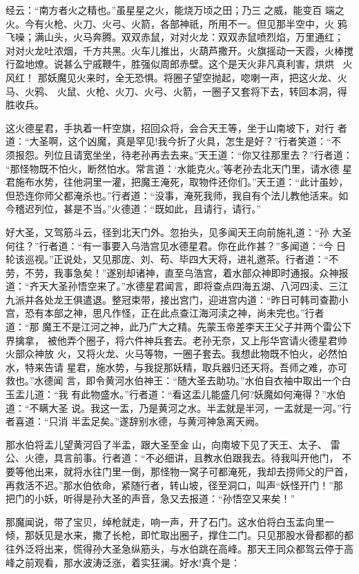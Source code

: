 经云：“南方者火之精也。”虽星星之火，能烧万顷之田；乃三之威，能变百
端之火。今有火枪、火刀、火弓、火箭，各部神祇，所用不一。但见那半空中，火
鸦飞噪；满山头，火马奔腾。双双赤鼠，对对火龙：双双赤鼠喷烈焰，万里通红；
对对火龙吐浓烟，千方共黑。火车儿推出，火葫芦撒开。火旗摇动一天霞，火棒搅
行盈地燎。说甚么宁戚鞭牛，胜强似周郎赤壁。这个是天火非凡真利害，烘烘
火风红！
那妖魔见火来时，全无恐惧。将圈子望空抛起，唿喇一声，把这火龙、火马、火鸦、
火鼠、火枪、火刀、火弓、火箭，一圈子又套将下去，转回本洞，得胜收兵。

这火德星君，手执着一杆空旗，招回众将，会合天王等，坐于山南坡下，对行
者道：“大圣啊，这个凶魔，真是罕见!我今折了火具，怎生是好？”行者笑道：“不
须报怨。列位且请宽坐坐，待老孙再去去来。”天王道：“你又往那里去？”行者道：
“那怪物既不怕火，断然怕水。常言道：‘水能克火。’等老孙去北天门里，请水德
星君施布水势，往他洞里一灌，把魔王淹死，取物件还你们。”天王道：“此计虽妙，
但恐连你师父都淹杀也。”行者道：“没事，淹死我师，我自有个法儿教他活来。如
今稽迟列位，甚是不当。”火德道：“既如此，且请行，请行。”

好大圣，又驾筋斗云，径到北天门外。忽抬头，见多闻天王向前施礼道：“孙
大圣何往？”行者道：“有一事要入乌浩宫见水德星君。你在此作甚？”多闻道：“今
日轮该巡视。”正说处，又见那庞、刘、苟、毕四大天将，进礼邀茶。行者道：“不
劳，不劳，我事急矣！”遂别却诸神，直至乌浩宫，着水部众神即时通报。众神报
道：“齐天大圣孙悟空来了。”水德星君闻言，即将查点四海五湖、八河四渎、三江
九派并各处龙王俱遣退。整冠束带，接出宫门，迎进宫内道：“昨日可韩司查勘小
宫，恐有本部之神，思凡作怪，正在此点查江海河渎之神，尚未完也。”行者道：“那
魔王不是江河之神，此乃广大之精。先蒙玉帝差李天王父子并两个雷公下界擒拿，
被他弄个圈子，将六件神兵套去。老孙无奈，又上彤华宫请火德星君帅火部众神放
火，又将火龙、火马等物，一圈子套去。我想此物既不怕火，必然怕水，特来告请
星君，施水势，与我捉那妖精，取兵器归还天将。吾师之难，亦可救也。”水德闻
言，即令黄河水伯神王：“随大圣去助功。”水伯自衣袖中取出一个白玉盂儿道：“我
有此物盛水。”行者道：“看这盂儿能盛几何?妖魔如何淹得？”水伯道：“不瞒大圣
说。我这一盂，乃是黄河之水。半盂就是半河，一盂就是一河。”行者喜道：“只消
半盂足矣。”遂辞别水德，与黄河神急离天阙。

那水伯将盂儿望黄河舀了半盂，跟大圣至金山，向南坡下见了天王、太子、
雷公、火德，具言前事。行者道：“不必细讲，且教水伯跟我去。待我叫开他门，
不要等他出来，就将水往门里一倒，那怪物一窝子可都淹死，我却去捞师父的尸首，
再救活不迟。”那水伯依命，紧随行者，转山坡，径至洞口，叫声“妖怪开门！”那
把门的小妖，听得是孙大圣的声音，急又去报道：“孙悟空又来矣！”

那魔闻说，带了宝贝，绰枪就走，响一声，开了石门。这水伯将白玉盂向里一
倾，那妖见是水来，撒了长枪，即忙取出圈子，撑住二门。只见那股水骨都都的都
往外泛将出来，慌得孙大圣急纵筋头，与水伯跳在高峰。那天王同众都驾云停于高
峰之前观看，那水波涛泛涨，着实狂澜。好水!真个是：

